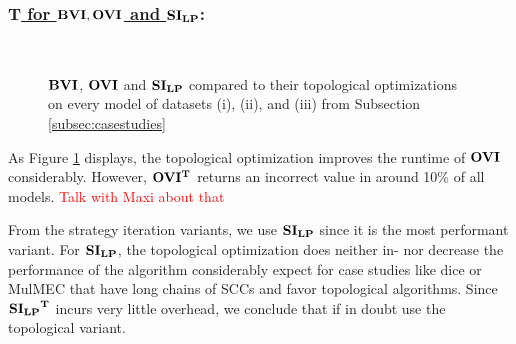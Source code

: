 \subsubsection*{\underline{$\mathbf{T}$ for $\mathbf{BVI}, \mathbf{OVI}$ and $\mathbf{SI_{LP}}$}:} \label{subsubsec:topologicalOptim}
\begin{figure}
    \centering
    \
    \caption{$\mathbf{BVI}$, $\mathbf{OVI}$ and $\mathbf{SI_{LP}}$ compared to their topological optimizations on every model of datasets (i), (ii), and (iii) from Subsection \ref{subsec:casestudies}}%
    \label{fig:Scatter_T}%
    \end{figure}
As Figure \ref{fig:Scatter_T} displays, the topological optimization improves the runtime of $\mathbf{OVI}$ considerably. 
However, $\mathbf{OVI^T}$ returns an incorrect value in around 10\% of all models. \textcolor{red}{Talk with Maxi about that}

From the strategy iteration variants, we use $\mathbf{SI_{LP}}$ since it is the most performant variant.
For $\mathbf{SI_{LP}}$, the topological optimization does neither in- nor decrease the performance of the algorithm considerably expect for case studies
like dice or MulMEC that have long chains of SCCs and favor topological algorithms.
Since $\mathbf{\mathbf{SI_{LP}}^T}$ incurs very little overhead, we conclude that if in doubt use the topological variant.

